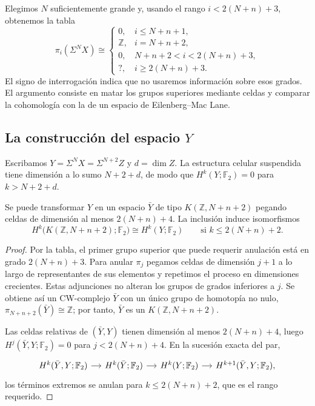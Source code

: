 Elegimos $N$ suficientemente grande y, usando el rango $i<2(N+n)+3$, obtenemos la tabla
\[
\pi_i(\Sigma^NX)\cong
\begin{cases}
0,& i\le N+n+1,\\
\mathbb Z,& i=N+n+2,\\
0,& N+n+2<i<2(N+n)+3,\\
\text{?},& i\ge2(N+n)+3.
\end{cases}
\]
El signo de interrogación indica que no usaremos información sobre esos grados. El argumento consiste en matar los grupos superiores mediante celdas y comparar la cohomología con la de un espacio de Eilenberg--Mac Lane.

\subsection{La construcción del espacio \texorpdfstring{$Y$}{Y}}

Escribamos $Y=\Sigma^NX=\Sigma^{N+2}Z$ y $d=\dim Z$. La estructura celular suspendida tiene dimensión a lo sumo $N+2+d$, de modo que $H^k(Y;\mathbb F_2)=0$ para $k>N+2+d$.

\begin{prop}\label{prop:Y}
Se puede transformar $Y$ en un espacio $\bar Y$ de tipo $K(\mathbb Z,N+n+2)$ pegando celdas de dimensión al menos $2(N+n)+4$. La inclusión induce isomorfismos
\[
H^k\bigl(K(\mathbb Z,N+n+2);\mathbb F_2\bigr)
\cong H^k(Y;\mathbb F_2)
\qquad\text{si }k\le2(N+n)+2.
\]
\end{prop}
\begin{proof}
Por la tabla, el primer grupo superior que puede requerir anulación está en grado $2(N+n)+3$. Para anular $\pi_j$ pegamos celdas de dimensión $j+1$ a lo largo de representantes de sus elementos y repetimos el proceso en dimensiones crecientes. Estas adjunciones no alteran los grupos de grados inferiores a $j$. Se obtiene así un CW-complejo $\bar Y$ con un único grupo de homotopía no nulo, $\pi_{N+n+2}(\bar Y)\cong\mathbb Z$; por tanto, $\bar Y$ es un $K(\mathbb Z,N+n+2)$.

Las celdas relativas de $(\bar Y,Y)$ tienen dimensión al menos $2(N+n)+4$, luego $H^j(\bar Y,Y;\mathbb F_2)=0$ para $j<2(N+n)+4$. En la sucesión exacta del par,
\[
\begin{tikzcd}[column sep=small]
H^k(\bar Y,Y;\mathbb F_2) \arrow[r] &
H^k(\bar Y;\mathbb F_2) \arrow[r] &
H^k(Y;\mathbb F_2) \arrow[r] &
H^{k+1}(\bar Y,Y;\mathbb F_2),
\end{tikzcd}
\]
los términos extremos se anulan para $k\le2(N+n)+2$, que es el rango requerido.
\end{proof}

